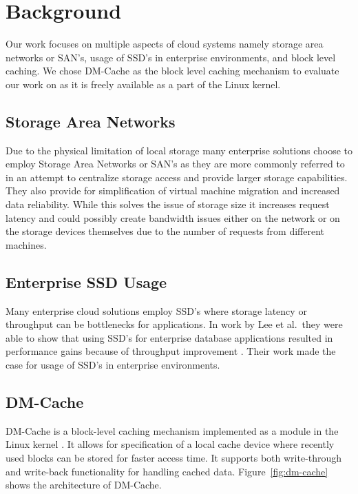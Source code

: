 \section{Background}

Our work focuses on multiple aspects of cloud systems namely storage
area networks or SAN's, usage of SSD's in enterprise environments, and
block level caching. We chose DM-Cache as the block level caching
mechanism to evaluate our work on as it is freely available as a part
of the Linux kernel.

\subsection{Storage Area Networks}

Due to the physical limitation of local storage many enterprise
solutions choose to employ Storage Area Networks or SAN's as they are
more commonly referred to in an attempt to centralize storage access
and provide larger storage capabilities. They also provide for
simplification of virtual machine migration and increased data
reliability. While this solves the issue of storage size it increases
request latency and could possibly create bandwidth issues either on
the network or on the storage devices themselves due to the number of
requests from different machines.

\subsection{Enterprise SSD Usage}

Many enterprise cloud solutions employ SSD's where storage latency or
throughput can be bottlenecks for applications. In work by Lee et al.\
they were able to show that using SSD's for enterprise database
applications resulted in performance gains because of throughput
improvement \cite{EnterpriseSSD}. Their work made the case for usage
of SSD's in enterprise environments.

\subsection{DM-Cache}

DM-Cache is a block-level caching mechanism implemented as a module in
the Linux kernel \cite{DM-Cache}. It allows for specification of a
local cache device where recently used blocks can be stored for faster
access time. It supports both write-through and write-back
functionality for handling cached data. Figure~\ref{fig:dm-cache}
shows the architecture of DM-Cache.

